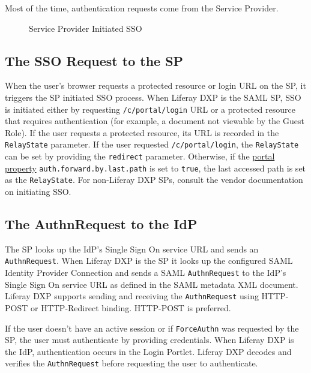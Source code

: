 Most of the time, authentication requests come from the Service
Provider.

\begin{figure}
\centering
{}
\caption{Service Provider Initiated SSO}
\end{figure}

\subsection{The SSO Request to the SP}\label{the-sso-request-to-the-sp}

When the user's browser requests a protected resource or login URL on
the SP, it triggers the SP initiated SSO process. When Liferay DXP is
the SAML SP, SSO is initiated either by requesting
\texttt{/c/portal/login} URL or a protected resource that requires
authentication (for example, a document not viewable by the Guest Role).
If the user requests a protected resource, its URL is recorded in the
\texttt{RelayState} parameter. If the user requested
\texttt{/c/portal/login}, the \texttt{RelayState} can be set by
providing the \texttt{redirect} parameter. Otherwise, if the
\href{@platform-ref@/7.2-latest/propertiesdoc/portal.properties.html}{portal
property} \texttt{auth.forward.by.last.path} is set to \texttt{true},
the last accessed path is set as the \texttt{RelayState}. For
non-Liferay DXP SPs, consult the vendor documentation on initiating SSO.

\subsection{The AuthnRequest to the
IdP}\label{the-authnrequest-to-the-idp}

The SP looks up the IdP's Single Sign On service URL and sends an
\texttt{AuthnRequest}. When Liferay DXP is the SP it looks up the
configured SAML Identity Provider Connection and sends a SAML
\texttt{AuthnRequest} to the IdP's Single Sign On service URL as defined
in the SAML metadata XML document. Liferay DXP supports sending and
receiving the \texttt{AuthnRequest} using HTTP-POST or HTTP-Redirect
binding. HTTP-POST is preferred.

If the user doesn't have an active session or if \texttt{ForceAuthn} was
requested by the SP, the user must authenticate by providing
credentials. When Liferay DXP is the IdP, authentication occurs in the
Login Portlet. Liferay DXP decodes and verifies the
\texttt{AuthnRequest} before requesting the user to authenticate.

